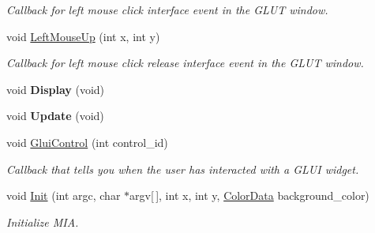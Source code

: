 \begin{DoxyCompactItemize}
\begin{DoxyCompactList}\small\item\em Callback for left mouse click interface event in the G\+L\+UT window. \end{DoxyCompactList}\item 
void \hyperlink{classimage__tools_1_1MIAApp_a2717842596d33af77f20644527a8b556}{Left\+Mouse\+Up} (int x, int y)\hypertarget{classimage__tools_1_1MIAApp_a2717842596d33af77f20644527a8b556}{}\label{classimage__tools_1_1MIAApp_a2717842596d33af77f20644527a8b556}

\begin{DoxyCompactList}\small\item\em Callback for left mouse click release interface event in the G\+L\+UT window. \end{DoxyCompactList}\item 
void {\bfseries Display} (void)\hypertarget{classimage__tools_1_1MIAApp_add76b61a146970333b216e027aabc3bc}{}\label{classimage__tools_1_1MIAApp_add76b61a146970333b216e027aabc3bc}

\item 
void {\bfseries Update} (void)\hypertarget{classimage__tools_1_1MIAApp_ab287849ffabfb942455ecb8967ae5fa1}{}\label{classimage__tools_1_1MIAApp_ab287849ffabfb942455ecb8967ae5fa1}

\item 
void \hyperlink{classimage__tools_1_1MIAApp_a4e10cc8b814e12c16c38d4e2be3bf2bb}{Glui\+Control} (int control\+\_\+id)\hypertarget{classimage__tools_1_1MIAApp_a4e10cc8b814e12c16c38d4e2be3bf2bb}{}\label{classimage__tools_1_1MIAApp_a4e10cc8b814e12c16c38d4e2be3bf2bb}

\begin{DoxyCompactList}\small\item\em Callback that tells you when the user has interacted with a G\+L\+UI widget. \end{DoxyCompactList}\item 
void \hyperlink{classimage__tools_1_1MIAApp_ab5bd2eb36e76c8bb81bef6c56f6bf55d}{Init} (int argc, char $\ast$argv\mbox{[}$\,$\mbox{]}, int x, int y, \hyperlink{classimage__tools_1_1ColorData}{Color\+Data} background\+\_\+color)
\begin{DoxyCompactList}\small\item\em Initialize M\+IA. \end{DoxyCompactList}\end{DoxyCompactItemize}
